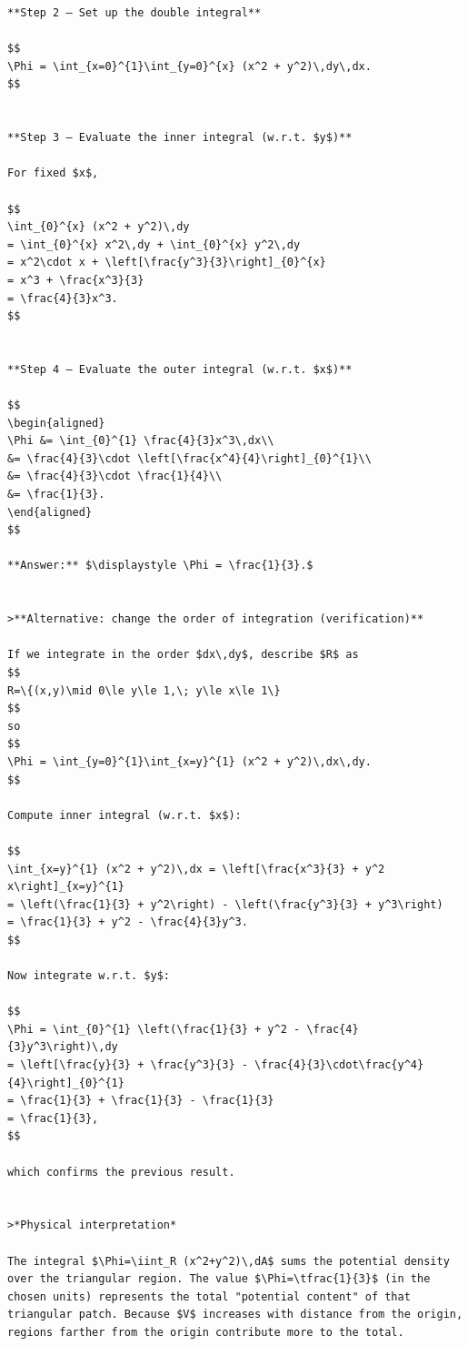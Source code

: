 \documentclass[
  letterpaper,
  DIV=11,
  numbers=noendperiod]{scrreprt}
\begin{document}
\begin{verbatim}
**Step 2 — Set up the double integral**

$$
\Phi = \int_{x=0}^{1}\int_{y=0}^{x} (x^2 + y^2)\,dy\,dx.
$$


**Step 3 — Evaluate the inner integral (w.r.t. $y$)**

For fixed $x$,

$$
\int_{0}^{x} (x^2 + y^2)\,dy
= \int_{0}^{x} x^2\,dy + \int_{0}^{x} y^2\,dy
= x^2\cdot x + \left[\frac{y^3}{3}\right]_{0}^{x}
= x^3 + \frac{x^3}{3}
= \frac{4}{3}x^3.
$$


**Step 4 — Evaluate the outer integral (w.r.t. $x$)**

$$
\begin{aligned}
\Phi &= \int_{0}^{1} \frac{4}{3}x^3\,dx\\
&= \frac{4}{3}\cdot \left[\frac{x^4}{4}\right]_{0}^{1}\\
&= \frac{4}{3}\cdot \frac{1}{4}\\
&= \frac{1}{3}.
\end{aligned}
$$

**Answer:** $\displaystyle \Phi = \frac{1}{3}.$


>**Alternative: change the order of integration (verification)**

If we integrate in the order $dx\,dy$, describe $R$ as
$$
R=\{(x,y)\mid 0\le y\le 1,\; y\le x\le 1\}
$$
so
$$
\Phi = \int_{y=0}^{1}\int_{x=y}^{1} (x^2 + y^2)\,dx\,dy.
$$

Compute inner integral (w.r.t. $x$):

$$
\int_{x=y}^{1} (x^2 + y^2)\,dx = \left[\frac{x^3}{3} + y^2 x\right]_{x=y}^{1}
= \left(\frac{1}{3} + y^2\right) - \left(\frac{y^3}{3} + y^3\right)
= \frac{1}{3} + y^2 - \frac{4}{3}y^3.
$$

Now integrate w.r.t. $y$:

$$
\Phi = \int_{0}^{1} \left(\frac{1}{3} + y^2 - \frac{4}{3}y^3\right)\,dy
= \left[\frac{y}{3} + \frac{y^3}{3} - \frac{4}{3}\cdot\frac{y^4}{4}\right]_{0}^{1}
= \frac{1}{3} + \frac{1}{3} - \frac{1}{3}
= \frac{1}{3},
$$

which confirms the previous result.


>*Physical interpretation*

The integral $\Phi=\iint_R (x^2+y^2)\,dA$ sums the potential density over the triangular region. The value $\Phi=\tfrac{1}{3}$ (in the chosen units) represents the total "potential content" of that triangular patch. Because $V$ increases with distance from the origin, regions farther from the origin contribute more to the total.



\end{verbatim}
\end{document}
